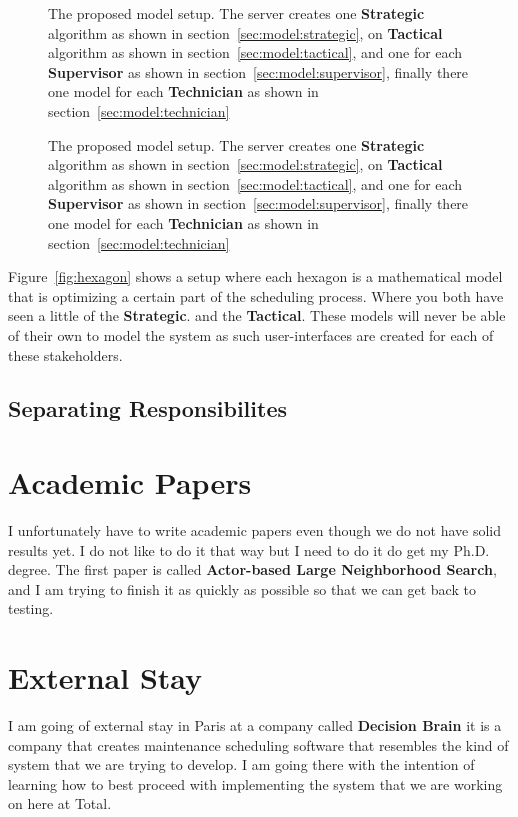 \begin{figure}[H]
	\centering
    \drawModelSetupHexagon[userinterface=false, persistence=false, metaheuristics=true]
	\caption{The proposed model setup. The server creates one \textbf{Strategic} algorithm as shown in section~\ref{sec:model:strategic}, 
	on \textbf{Tactical} algorithm as shown in section~\ref{sec:model:tactical}, and 
	one for each \textbf{Supervisor} as shown in section~\ref{sec:model:supervisor}, 
	finally there one model for each \textbf{Technician} as shown in section~\ref{sec:model:technician}}
	\label{fig:hexagon:metaheuristics}
\end{figure}

\begin{figure}[H]
	\centering
    \drawModelSetupHexagon[userinterface=true, persistence=false, metaheuristics=false]
	\caption{The proposed model setup. The server creates one \textbf{Strategic} algorithm as shown in section~\ref{sec:model:strategic}, 
	on \textbf{Tactical} algorithm as shown in section~\ref{sec:model:tactical}, and 
	one for each \textbf{Supervisor} as shown in section~\ref{sec:model:supervisor}, 
	finally there one model for each \textbf{Technician} as shown in section~\ref{sec:model:technician}}
	\label{fig:hexagon:userinterfaces}
\end{figure}

Figure~\ref{fig:hexagon} shows a setup where each hexagon is a mathematical model that is optimizing
a certain part of the scheduling process. Where you both have seen a little of the \textbf{Strategic}.
and the \textbf{Tactical}. These models will never be able of their own to model the system as such user-interfaces are 
created for each of these stakeholders.


\subsection{Separating Responsibilites}


\subsection{}

\section{Academic Papers}
I unfortunately have to write academic papers even though we do not have solid results yet.
I do not like to do it that way but I need to do it do get my Ph.D. degree. The first paper
is called \textbf{Actor-based Large Neighborhood Search}, and I am trying to finish it as 
quickly as possible so that we can get back to testing.


\section{External Stay}
I am going of external stay in Paris at a company called \textbf{Decision Brain} it is a 
company that creates maintenance scheduling software that resembles the kind of system 
that we are trying to develop. I am going there with the intention of learning how to
best proceed with implementing the system that we are working on here at Total.
